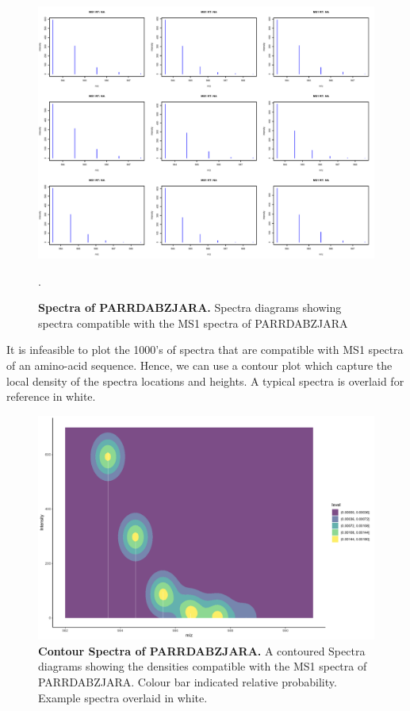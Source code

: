 \documentclass[12pt,english, journal=jpr, layout=twocolumn]{article}
\begin{document}
\begin{figure}[H]
	\centering
	\includegraphics[width =1\textwidth]{aaMS1example.pdf}
	\caption{\textbf{Spectra of PARRDABZJARA.} Spectra diagrams showing spectra compatible with the MS1 spectra of PARRDABZJARA}.
	\label{figure::figure2spectraexample}
\end{figure}

It is infeasible to plot the 1000's of spectra that are compatible with MS1 spectra of an amino-acid sequence. Hence, we can use a contour plot which capture the local density of the spectra locations and heights. A typical spectra is overlaid for reference in white.

 \begin{figure}[H]
 	\centering
 	\includegraphics[width =1\textwidth]{spectrauncertaintyplot.pdf}
 	\caption{\textbf{Contour Spectra of PARRDABZJARA.} A contoured Spectra diagrams showing the densities compatible with the MS1 spectra of PARRDABZJARA. Colour bar indicated relative probability. Example spectra overlaid in white.}
 	\label{figure::figure3spectrauncertaintyplot}
 \end{figure}

	
\end{document}
